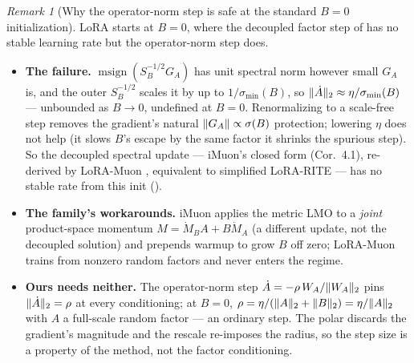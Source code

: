 \documentclass[11pt]{article}
\DeclarePairedDelimiter{\norm}{\lVert}{\rVert}
\DeclareMathOperator{\polar}{msign}          %
\theoremstyle{plain}
\theoremstyle{definition}
\theoremstyle{remark}
\newtheorem{remark}{Remark}
\begin{document}
\begin{remark}[Why the operator-norm step is safe at the standard $B{=}0$ initialization]
\label{rem:b0}
LoRA starts at $B{=}0$, where the decoupled factor step of  has no stable learning rate but the operator-norm step does.
\begin{itemize}[leftmargin=1.5em,itemsep=1pt,topsep=2pt]
  \item \textbf{The failure.} $\polar(S_B^{-1/2}G_A)$ has unit spectral norm however small $G_A$ is, and the outer $S_B^{-1/2}$ scales it by up to $1/\sigma_{\min}(B)$, so $\norm{\dot A}_2\approx\eta/\sigma_{\min}(B)$ --- unbounded as $B\to0$, undefined at $B{=}0$. Renormalizing to a scale-free step removes the gradient's natural $\norm{G_A}\propto\sigma(B)$ protection; lowering $\eta$ does not help (it slows $B$'s escape by the same factor it shrinks the spurious step). So the decoupled spectral update --- iMuon's closed form (Cor.\ 4.1), re-derived by LoRA-Muon \cite{loramuon}, equivalent to simplified LoRA-RITE \cite{lorarite} --- has no stable rate from this init ().
  \item \textbf{The family's workarounds.} iMuon applies the metric LMO to a \emph{joint} product-space momentum $M=\dot M_BA+B\dot M_A$ (a different update, not the decoupled solution) and prepends warmup to grow $B$ off zero; LoRA-Muon trains from nonzero random factors and never enters the regime.
  \item \textbf{Ours needs neither.} The operator-norm step $\dot A=-\rho\,W_A/\norm{W_A}_2$ pins $\norm{\dot A}_2=\rho$ at every conditioning; at $B{=}0$, $\rho=\eta/(\norm{A}_2+\norm{B}_2)=\eta/\norm{A}_2$ with $A$ a full-scale random factor --- an ordinary step. The polar discards the gradient's magnitude and the rescale re-imposes the radius, so the step size is a property of the method, not the factor conditioning.
\end{itemize}
\end{remark}
\end{document}
